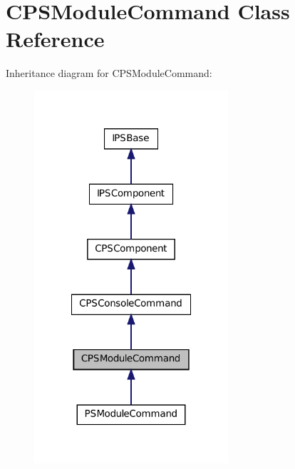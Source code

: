 \hypertarget{classCPSModuleCommand}{
\section{CPSModuleCommand Class Reference}
\label{classCPSModuleCommand}
}


Inheritance diagram for CPSModuleCommand:\nopagebreak
\begin{figure}[H]
\begin{center}
\leavevmode
\includegraphics[width=204pt]{classCPSModuleCommand__inherit__graph}
\end{center}
\end{figure}


